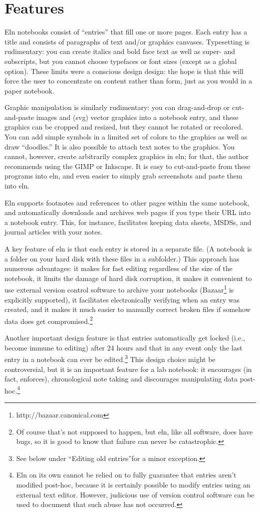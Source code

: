 \documentclass[11pt]{report}
\begin{document}
\section{Features}

Eln notebooks consist of ``entries'' that fill one or more pages.
Each entry has a title and consists of paragraphs of text and/or
graphics canvases. Typesetting is rudimentary: you can create italics
and bold face text as well as super- and subscripts, but you cannot
choose typefaces or font sizes (except as a global option). These
limits were a conscious design design: the hope is that this will
force the user to concentrate on content rather than form, just as you
would in a paper notebook.

Graphic manipulation is similarly rudimentary: you can drag-and-drop
or cut-and-paste images and (svg) vector graphics into a notebook
entry, and these graphics can be cropped and resized, but they cannot
be rotated or recolored. You can add simple symbols in a limited set
of colors to the graphics as well as draw ``doodles.'' It is also
possible to attach text notes to the graphics. You cannot, however,
create arbitrarily complex graphics in eln; for that, the author
recommends using the GIMP or Inkscape. It is easy to cut-and-paste
from these programs into eln, and even easier to simply grab
screenshots and paste them into eln.

Eln supports footnotes and references to other pages within the same
notebook, and automatically downloads and archives web pages if you
type their URL into a notebook entry. This, for instance, facilitates
keeping data sheets, MSDSs, and journal articles with your notes.

A key feature of eln is that each entry is stored in a separate
file. (A notebook is a folder on your hard disk with these files in a
subfolder.) This approach has numerous advantages: it makes for fast
editing regardless of the size of the notebook, it limits the damage
of hard disk corruption, it makes it convenient to use external
version control software to archive your notebooks
(Bazaar\footnote{http://bazaar.canonical.com} is explicitly
supported), it facilitates electronically verifying when an entry was
created, and it makes it much easier to manually correct broken files
if somehow data does get compromised.\footnote{Of course that's not
  supposed to happen, but eln, like all software, does have bugs, so
  it is good to know that failure can never be catastrophic.}

Another important design feature is that entries automatically get
locked (i.e., become immune to editing) after 24 hours and that in any
event only the last entry in a notebook can ever be
edited.\footnote{See below under ``Editing old entries''for a minor
  exception.} This design choice might be controversial, but it is an
important feature for a lab notebook: it encourages (in fact,
enforces), chronological note taking and discourages manipulating data
post-hoc.\footnote{Eln on its own cannot be relied on to fully
  guarantee that entries aren't modified post-hoc, because it is
  certainly possible to modify entries using an external text
  editor. However, judicious use of version control software can be
  used to document that such abuse has not occurred.}
\end{document}
